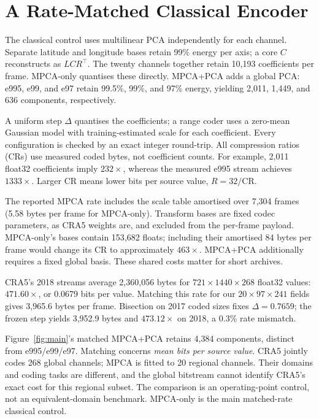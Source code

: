 \section{A Rate-Matched Classical Encoder}
\label{sec:encoder}

The classical control uses multilinear PCA independently for each channel. Separate
latitude and longitude bases retain 99\% energy per axis; a core $C$ reconstructs
as $LCR^{\!\top}$. The twenty channels together retain 10{,}193 coefficients per
frame. MPCA-only quantises these directly. MPCA+PCA adds a global PCA: e995, e99,
and e97 retain 99.5\%, 99\%, and 97\% energy, yielding 2{,}011, 1{,}449, and
636 components, respectively.

A uniform step $\Delta$ quantises the coefficients; a range coder uses a
zero-mean Gaussian model with training-estimated scale for each coefficient.
Every configuration is checked by an exact integer round-trip. All compression
ratios (CRs) use measured coded bytes, not coefficient counts. For example,
2{,}011 float32 coefficients imply $232\times$, whereas the measured e995 stream
achieves $1333\times$. Larger CR means lower bits per source value,
$R=32/\mathrm{CR}$.

The reported MPCA rate includes the scale table amortised over 7{,}304 frames
(5.58 bytes per frame for MPCA-only). Transform bases are fixed codec parameters,
as CRA5 weights are, and excluded from the per-frame payload. MPCA-only's bases
contain 153{,}682 floats; including their amortised 84 bytes per frame would
change its CR to approximately $463\times$. MPCA+PCA additionally requires a
fixed global basis. These shared costs matter for short archives.

CRA5's 2018 streams average 2{,}360{,}056 bytes for
$721\times1440\times268$ float32 values: $471.60\times$, or 0.0679 bits per value.
Matching this rate for our $20\times97\times241$ fields gives 3{,}965.6 bytes per
frame. Bisection on 2017 coded sizes fixes $\Delta=0.7659$; the frozen step yields
3{,}952.9 bytes and $473.12\times$ on 2018, a 0.3\% rate mismatch.

Figure~\ref{fig:main}'s matched MPCA+PCA retains 4{,}384 components, distinct
from e995/e99/e97. Matching concerns \emph{mean bits per source value}. CRA5 jointly codes 268 global
channels; MPCA is fitted to 20 regional channels. Their domains and coding tasks
are different, and the global bitstream cannot identify CRA5's exact cost for
this regional subset. The comparison is an operating-point control, not an
equivalent-domain benchmark. MPCA-only is the main matched-rate classical control.
